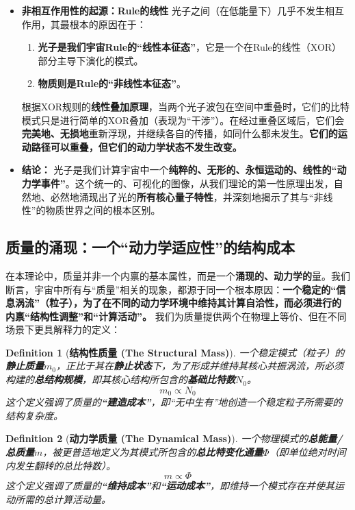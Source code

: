 \documentclass[11pt, a4paper]{article}
\newtheorem{definition}{Definition}[section]
\begin{document}
\begin{itemize}
    \item \textbf{非相互作用性的起源：Rule的线性}
    光子之间（在低能量下）几乎不发生相互作用，其最根本的原因在于：
    \begin{enumerate}
        \item \textbf{光子是我们宇宙Rule的“线性本征态”}，它是一个在Rule的线性（XOR）部分主导下演化的模式。
        \item \textbf{物质则是Rule的“非线性本征态”}。
    \end{enumerate}
    根据XOR规则的\textbf{线性叠加原理}，当两个光子波包在空间中重叠时，它们的比特模式只是进行简单的XOR叠加（表现为“干涉”）。在经过重叠区域后，它们会\textbf{完美地、无损地}重新浮现，并继续各自的传播，如同什么都未发生。\textbf{它们的运动路径可以重叠，但它们的动力学状态不发生改变。}

    \item \textbf{结论：}
    光子是我们计算宇宙中一个\textbf{纯粹的、无形的、永恒运动的、线性的“动力学事件”}。这个统一的、可视化的图像，从我们理论的第一性原理出发，自然地、必然地涌现出了光的\textbf{所有核心量子特性}，并深刻地揭示了其与“非线性”的物质世界之间的根本区别。
\end{itemize}

\subsection{质量的涌现：一个“动力学适应性”的结构成本}

在本理论中，质量并非一个内禀的基本属性，而是一个\textbf{涌现的、动力学的}量。我们断言，宇宙中所有与“质量”相关的现象，都源于同一个根本原因：\textbf{一个稳定的“信息涡流”（粒子），为了在不同的动力学环境中维持其计算自洽性，而必须进行的内禀“结构性调整”和“计算活动”。}
我们为质量提供两个在物理上等价、但在不同场景下更具解释力的定义：

\begin{definition}[\textbf{结构性质量 (The Structural Mass)}]
一个稳定模式（粒子）的\textbf{静止质量$m_0$}，正比于其在\textbf{静止状态}下，为了形成并维持其核心共振涡流，所必须构建的\textbf{总结构规模}，即其核心结构所包含的\textbf{基础比特数$N_0$}。
\[
m_0 \propto N_0
\]
这个定义强调了质量的\textbf{“建造成本”}，即“无中生有”地创造一个稳定粒子所需要的结构复杂度。
\end{definition}

\begin{definition}[\textbf{动力学质量 (The Dynamical Mass)}]
一个物理模式的\textbf{总能量/总质量$m$}，被更普适地定义为其模式所包含的\textbf{总比特变化通量$\Phi$}（即单位绝对时间内发生翻转的总比特数）。
\[
m \propto \Phi
\]
这个定义强调了质量的\textbf{“维持成本”}和\textbf{“运动成本”}，即维持一个模式存在并使其运动所需的总计算活动量。
\end{definition}
\end{document}
